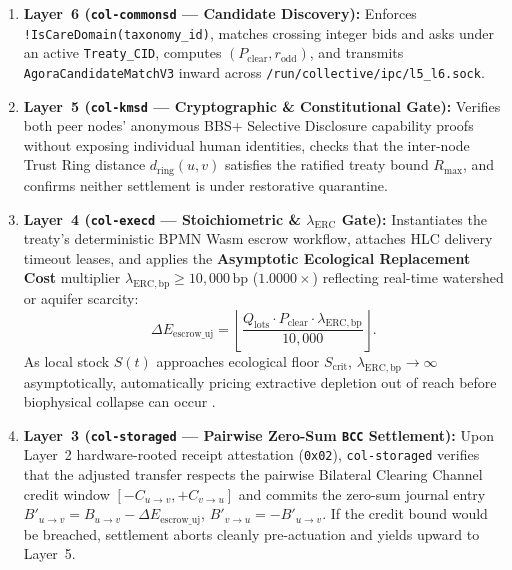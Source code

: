 \begin{enumerate}
  \item \textbf{Layer~6 (\texttt{col-commonsd} --- Candidate Discovery):} Enforces \texttt{!IsCareDomain(taxonomy\_id)}, matches crossing integer bids and asks under an active \texttt{Treaty\_CID}, computes $(P_{\mathrm{clear}}, r_{\mathrm{odd}})$, and transmits \texttt{AgoraCandidateMatchV3} inward across \texttt{/run/collective/ipc/l5\_l6.sock}.
  \item \textbf{Layer~5 (\texttt{col-kmsd} --- Cryptographic \& Constitutional Gate):} Verifies both peer nodes' anonymous BBS+ Selective Disclosure capability proofs \parencite{camenisch2004signature,w3c2022vc} without exposing individual human identities, checks that the inter-node Trust Ring distance $d_{\mathrm{ring}}(u, v)$ satisfies the ratified treaty bound $R_{\max}$, and confirms neither settlement is under restorative quarantine.
  \item \textbf{Layer~4 (\texttt{col-execd} --- Stoichiometric \& $\lambda_{\mathrm{ERC}}$ Gate):} Instantiates the treaty's deterministic BPMN Wasm escrow workflow, attaches HLC delivery timeout leases, and applies the \textbf{Asymptotic Ecological Replacement Cost} multiplier $\lambda_{\mathrm{ERC,bp}} \ge 10{,}000\,\mathrm{bp}$ ($1.0000\times$) reflecting real-time watershed or aquifer scarcity:
  \begin{equation}
    \Delta E_{\mathrm{escrow\_uj}} = \left\lfloor \frac{Q_{\mathrm{lots}} \cdot P_{\mathrm{clear}} \cdot \lambda_{\mathrm{ERC,bp}}}{10{,}000} \right\rfloor.
    \label{eq:erc-adjusted-escrow}
  \end{equation}
  As local stock $S(t)$ approaches ecological floor $S_{\mathrm{crit}}$, $\lambda_{\mathrm{ERC,bp}} \to \infty$ asymptotically, automatically pricing extractive depletion out of reach before biophysical collapse can occur \parencite{raworth2017,meadows2008}.
  \item \textbf{Layer~3 (\texttt{col-storaged} --- Pairwise Zero-Sum \texttt{BCC} Settlement):} Upon Layer~2 hardware-rooted receipt attestation (\texttt{0x02}), \texttt{col-storaged} verifies that the adjusted transfer respects the pairwise Bilateral Clearing Channel credit window $[-C_{u \to v}, +C_{v \to u}]$ and commits the zero-sum journal entry $B'_{u \to v} = B_{u \to v} - \Delta E_{\mathrm{escrow\_uj}}$, $B'_{v \to u} = -B'_{u \to v}$. If the credit bound would be breached, settlement aborts cleanly pre-actuation and yields upward to Layer~5.
\end{enumerate}

